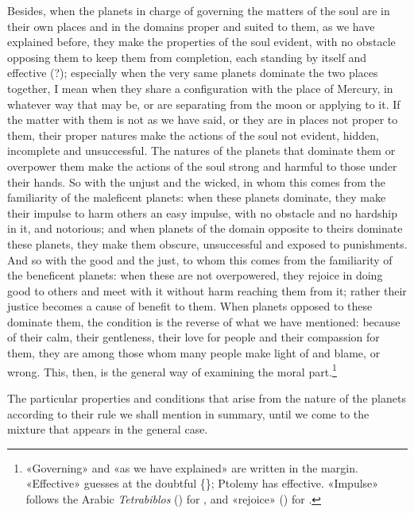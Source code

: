 \documentclass[11pt]{article}
\newcommand{\Fol}[1]{\marginpar{\footnotesize\color{gray}f.\,#1}}
\begin{document}
\par Besides, when the planets in charge of governing the matters of the soul are in their own places and in the domains proper and suited to them, as we have explained before, they make the properties of the soul evident, with no obstacle opposing them to keep them from completion, each standing by itself and effective (?); especially when the very same planets dominate the two places together, I mean when they share a configuration with the place of Mercury, in whatever way that may be, or are separating from the moon or applying to it. If the matter with them is not as we have said, or they are in places not proper to them, their proper natures make the actions of the soul not evident, hidden, incomplete and unsuccessful. The natures of the planets that dominate them or overpower them make the actions of the soul strong and harmful to those under their hands. So with the unjust and the wicked, in whom this comes from the familiarity of the maleficent planets: when these planets dominate, they make their impulse to harm others an easy impulse, with no obstacle and no hardship in it, and notorious; and when planets of the domain opposite to theirs dominate these planets, they make them obscure, unsuccessful and exposed to punishments. And so with the good and the just, to whom this comes from the familiarity of the beneficent planets: when these are not overpowered, they rejoice in doing good to others and meet with it without harm reaching them from it; rather their justice becomes a cause of benefit to them. When planets opposed to these dominate them, the condition is the reverse of what we have mentioned: because of their calm, their gentleness, their love for people and their compassion for them, they are among those whom many people make light of and blame, or wrong. This, then, is the general way of examining the moral part.\footnote{«Governing» and «as we have explained» are written in the margin. «Effective» guesses at the doubtful \{\}; Ptolemy has effective. «Impulse» follows the Arabic \emph{Tetrabiblos} () for , and «rejoice» () for .}\par
\par \Fol{56v}The particular properties and conditions that arise from the nature of the planets according to their rule we shall mention in summary, until we come to the mixture that appears in the general case.\par
\end{document}
